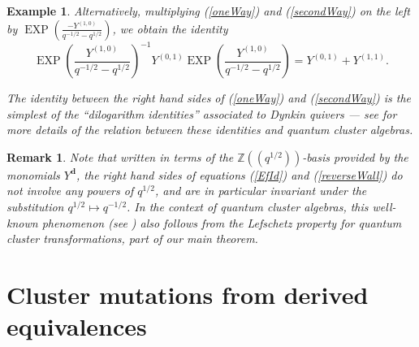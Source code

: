 \documentclass[a4paper,10pt]{amsart}
\newtheorem{example}[theorem]{Example}
\newtheorem{remark}[theorem]{Remark}
\newcommand{\dd}{\mathbf{d}}
\DeclareMathOperator{\EXP}{EXP}
\newcommand{\pleth}[1]{\EXP\left(#1\right)}
\begin{document}
\begin{example}
Alternatively, multiplying (\ref{oneWay}) and (\ref{secondWay}) on the left by $\pleth{\frac{-Y^{(1,0)}}{q^{-1/2}-q^{1/2}}}$, we obtain the identity
\begin{equation}
\label{reverseWall}
\pleth{\frac{Y^{(1,0)}}{q^{-1/2}-q^{1/2}}}^{-1}Y^{(0,1)}\pleth{\frac{Y^{(1,0)}}{q^{-1/2}-q^{1/2}}}=Y^{(0,1)}+Y^{(1,1)}.
\end{equation}


The identity between the right hand sides of (\ref{oneWay}) and (\ref{secondWay}) is the simplest of the ``dilogarithm identities'' associated to Dynkin quivers --- see \cite{Keller10} for more details of the relation between these identities and quantum cluster algebras.  
\end{example}
\begin{remark}
Note that written in terms of the $\mathbb{Z}((q^{1/2}))$-basis provided by the monomials $Y^{\dd}$, the right hand sides of equations (\ref{EfId}) and (\ref{reverseWall}) do not involve any powers of $q^{1/2}$, and are in particular invariant under the substitution $q^{1/2}\mapsto q^{-1/2}$.  In the context of quantum cluster algebras, this well-known phenomenon (see \cite[Prop.6.2]{BZ05}) also follows from the Lefschetz property for quantum cluster transformations, part of our main theorem.
\end{remark}


\section{Cluster mutations from derived equivalences}
\end{document}
